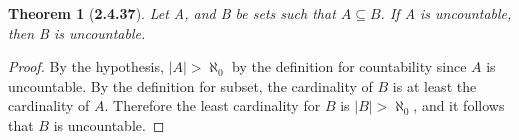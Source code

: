 \documentclass[a4paper, 12pt]{article}
\theoremstyle{plain}
\newtheorem*{theorem*}{Theorem}
\begin{document}
	
\begin{theorem*}[\textbf{2.4.37}]
    Let A, and B be sets such that $A \subseteq B$. If A is \newline uncountable, then B is 
    uncountable.
\end{theorem*}

\begin{proof}
    By the hypothesis, $|A| > \aleph_0$ by the definition for countability since $A$ is 
    uncountable. By the definition for subset, the cardinality of $B$ is at least the cardinality 
    of $A$. Therefore the least cardinality for $B$ is $|B| > \aleph_0$, and it follows that $B$ 
    is uncountable.
\end{proof}
\end{document}
